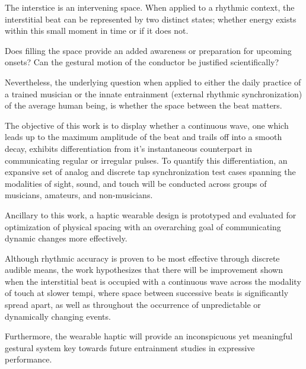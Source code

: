 
\setlength{\parskip}{1em}
\setlength{\parindent}{0em}

\noindent
The interstice is an intervening space. When applied to a rhythmic context, the interstitial beat can be represented by two distinct states; whether energy exists within this small moment in time or if it does not. 

Does filling the space provide an added awareness or preparation for upcoming onsets? Can the gestural motion of the conductor be justified scientifically?

Nevertheless, the underlying question when applied to either the daily practice of a trained musician or the innate entrainment (external rhythmic synchronization) of the average human being, is whether the space between the beat matters.

The objective of this work is to display whether a continuous wave, one which leads up to the maximum amplitude of the beat and trails off into a smooth decay, exhibits differentiation from it's instantaneous counterpart in communicating regular or irregular pulses. To quantify this differentiation, an expansive set of analog and discrete tap synchronization test cases spanning the modalities of sight, sound, and touch will be conducted across groups of musicians, amateurs, and non-musicians.

Ancillary to this work, a haptic wearable design is prototyped and evaluated for optimization of physical spacing with an overarching goal of communicating dynamic changes more effectively.

Although rhythmic accuracy is proven to be most effective through discrete audible means, the work hypothesizes that there will be improvement shown when the interstitial beat is occupied with a continuous wave across the modality of touch at slower tempi, where space between successive beats is significantly spread apart, as well as throughout the occurrence of unpredictable or dynamically changing events. 

Furthermore, the wearable haptic will provide an inconspicuous yet meaningful gestural system key towards future entrainment studies in expressive performance.
